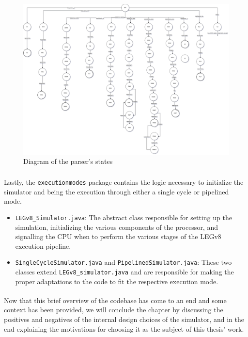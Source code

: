 \begin{landscape}
    \begin{figure}[H]
	\centering
	\includegraphics[width=1.25\textwidth]{img/parser_diagram.png}
	\caption{Diagram of the parser's states}
        \label{fig:oldparser}
\end{figure}
\end{landscape}
\subparagraph{}
Lastly, the \verb|executionmodes| package contains the logic necessary to initialize the simulator and being the execution through either a single cycle or pipelined mode.
\begin{itemize}
	\item \verb|LEGv8_Simulator.java|: The abstract class responsible for setting up the simulation, initializing the various components of the processor, and signalling the CPU when to perform the various stages of the LEGv8 execution pipeline.
	\item \verb|SingleCycleSimulator.java| and \verb|PipelinedSimulator.java|: These two classes extend \verb|LEGv8_simulator.java| and are responsible for making the proper adaptations to the code to fit the respective execution mode.
\end{itemize}
\paragraph{}
Now that this brief overview of the codebase has come to an end and some context has been provided, we will conclude the chapter by discussing the positives and negatives of the internal design choices of the simulator, and in the end explaining the motivations for choosing it as the subject of this thesis' work.
